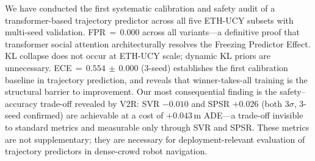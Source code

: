 \documentclass[journal]{IEEEtran}
\begin{document}
We have conducted the first systematic calibration and safety audit of
a transformer-based trajectory predictor across all five ETH-UCY
subsets with multi-seed validation.
FPR\,\(=\,0.000\) across all variants---a definitive proof that
transformer social attention architecturally resolves the Freezing
Predictor Effect.
KL collapse does not occur at ETH-UCY scale; dynamic KL priors are
unnecessary.
ECE\,\(=\,0.554\,\pm\,0.000\) (3-seed) establishes the first
calibration baseline in trajectory prediction, and reveals that
winner-takes-all training is the structural barrier to improvement.
Our most consequential finding is the safety--accuracy trade-off
revealed by V2R: SVR $-0.010$ and SPSR $+0.026$ (both $3\sigma$,
3-seed confirmed) are achievable at a cost of $+0.043$\,m ADE---a
trade-off invisible to standard metrics and measurable only through
SVR and SPSR.
These metrics are not supplementary; they are necessary for
deployment-relevant evaluation of trajectory predictors in dense-crowd
robot navigation.



\end{document}
